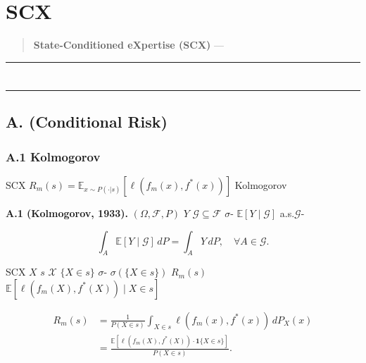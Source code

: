 \documentclass[
  12pt,
]{article}
\author{SCX}
\date{2026}
\begin{document}
\section{SCX
}\label{scx-ux6846ux67b6ux7684ux6570ux5b66ux57faux7840ux6df1ux5ea6ux8ffdux6eafux4e0eux8bc1ux660eux5efaux6784}

\begin{quote}
\textbf{State-Conditioned eXpertise (SCX)} ---
\\

\end{quote}

\begin{center}\rule{0.5\linewidth}{0.5pt}\end{center}

\section{}\label{ux7b2cux4e00ux90e8ux5206ux6570ux5b66ux6839ux6e90ux5b8cux6574ux8ffdux6eaf}

\begin{center}\rule{0.5\linewidth}{0.5pt}\end{center}

\subsection{A.  (Conditional
Risk)}\label{a.-ux6761ux4ef6ux98ceux9669-conditional-risk}

\subsubsection{A.1  Kolmogorov
}\label{a.1-ux4ece-kolmogorov-ux6761ux4ef6ux671fux671bux51faux53d1}

SCX 
\(R_m(s) = \mathbb{E}_{x \sim P(\cdot|s)}[\ell(f_m(x), f^*(x))]\) 
Kolmogorov 

\textbf{ A.1 (Kolmogorov, 1933).}  \((\Omega, \mathcal{F}, P)\)
\(Y\) \(\mathcal{G} \subseteq \mathcal{F}\)
 \(\sigma\)- \(\mathbb{E}[Y \mid \mathcal{G}]\)
a.s.\(\mathcal{G}\)-

\[\int_A \mathbb{E}[Y \mid \mathcal{G}] \, dP = \int_A Y \, dP, \quad \forall A \in \mathcal{G}.\]

 SCX  \(X\) \(s\)  \(\mathcal{X}\)
 \(\{X \in s\}\)  \(\sigma\)-
\(\sigma(\{X \in s\})\) \(R_m(s)\) 
\(\mathbb{E}[\ell(f_m(X), f^*(X)) \mid X \in s]\) 

 \[\begin{aligned}
R_m(s) &= \frac{1}{P(X \in s)} \int_{X \in s} \ell(f_m(x), f^*(x)) \, dP_X(x) \\
&= \frac{\mathbb{E}[\ell(f_m(X), f^*(X)) \cdot \mathbf{1}\{X \in s\}]}{P(X \in s)}.
\end{aligned}\]
\end{document}
